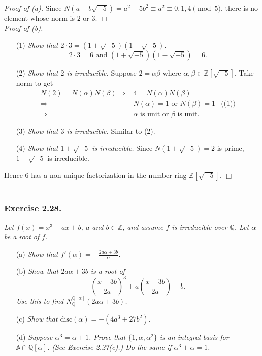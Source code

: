 \documentclass{article}
\begin{document}
\emph{Proof of (a).}
Since $N(a+b\sqrt{-5}) = a^2 + 5b^2 \equiv a^2 \equiv 0,1,4 \pmod{5}$,
there is no element whose norm is $2$ or $3$.
$\Box$ \\

\emph{Proof of (b).}
\begin{enumerate}
\item[(1)]
\emph{Show that $2 \cdot 3 = (1+\sqrt{-5})(1-\sqrt{-5})$.}
$$2 \cdot 3 = 6 \text{ and } (1+\sqrt{-5})(1-\sqrt{-5}) = 6.$$
\item[(2)]
\emph{Show that $2$ is irreducible.}
Suppose $2 = \alpha\beta$ where $\alpha, \beta \in \mathbb{Z}[\sqrt{-5}]$.
Take norm to get
\begin{align*}
  N(2) = N(\alpha)N(\beta)
  \Longrightarrow&
  4 = N(\alpha)N(\beta) \\
  \Longrightarrow&
  N(\alpha) = 1 \text{ or } N(\beta) = 1
    &\text{((1))} \\
  \Longrightarrow&
  \text{$\alpha$ is unit or $\beta$ is unit}.
\end{align*}
\item[(3)]
\emph{Show that $3$ is irreducible.}
Similar to (2).
\item[(4)]
\emph{Show that $1 \pm \sqrt{-5}$ is irreducible.}
Since $N(1 \pm \sqrt{-5}) = 2$ is prime, $1+\sqrt{-5}$ is irreducible.
\end{enumerate}
Hence $6$ has a non-unique factorization
in the number ring $\mathbb{Z}[\sqrt{-5}]$.
$\Box$ \\\\






\subsubsection*{Exercise 2.28.}
\emph{Let $f(x) = x^3+ax+b$, $a$ and $b \in \mathbb{Z}$,
and assume $f$ is irreducible over $\mathbb{Q}$.
Let $\alpha$ be a root of $f$.}
\begin{enumerate}
\item[(a)]
\emph{Show that $f'(\alpha) = -\frac{2a\alpha+3b}{\alpha}$.}
\item[(b)]
\emph{Show that $2a\alpha+3b$ is a root of
$$\left( \frac{x-3b}{2a} \right)^3 + a\left( \frac{x-3b}{2a} \right) + b.$$
Use this to find $N_{\mathbb{Q}}^{\mathbb{Q}[\alpha]} (2a\alpha+3b)$.}
\item[(c)]
\emph{Show that $\text{disc}(\alpha) = -(4a^3+27b^2)$.}
\item[(d)]
\emph{Suppose $\alpha^3=\alpha+1$.
Prove that $\{1,\alpha,\alpha^2\}$ is an integral basis for $\mathbb{A}\cap\mathbb{Q}[\alpha]$.
(See Exercise 2.27(e).)
Do the same if $\alpha^3+\alpha=1$.} \\
\end{enumerate}
\end{document}
